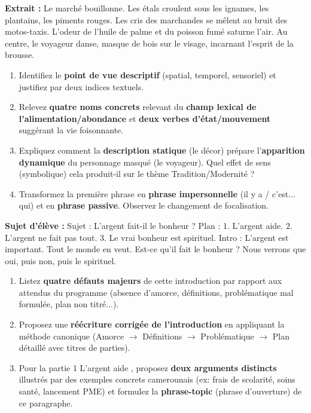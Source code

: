 \documentclass[11pt]{article}
\begin{document}
\begin{exercice}
\textbf{Extrait :} \og Le marché bouillonne. Les étals croulent sous les ignames, les plantains, les piments rouges. Les cris des marchandes se mêlent au bruit des motos-taxis. L'odeur de l'huile de palme et du poisson fumé saturne l'air. Au centre, le voyageur danse, masque de bois sur le visage, incarnant l'esprit de la brousse. \fg{}
\begin{enumerate}
    \item Identifiez le \textbf{point de vue descriptif} (spatial, temporel, sensoriel) et justifiez par deux indices textuels.
    \item Relevez \textbf{quatre noms concrets} relevant du \textbf{champ lexical de l'alimentation/abondance} et \textbf{deux verbes d'état/mouvement} suggérant la vie foisonnante.
    \item Expliquez comment la \textbf{description statique} (le décor) prépare l'\textbf{apparition dynamique} du personnage masqué (le voyageur). Quel effet de sens (symbolique) cela produit-il sur le thème Tradition/Modernité ?
    \item Transformez la première phrase en \textbf{phrase impersonnelle} (il y a / c'est... qui) et en \textbf{phrase passive}. Observez le changement de focalisation.
\end{enumerate}
\end{exercice}

\begin{exercice}
\textbf{Sujet d'élève :} \og Sujet : L'argent fait-il le bonheur ? Plan : 1. L'argent aide. 2. L'argent ne fait pas tout. 3. Le vrai bonheur est spirituel. Intro : L'argent est important. Tout le monde en veut. Est-ce qu'il fait le bonheur ? Nous verrons que oui, puis non, puis le spirituel. \fg{}
\begin{enumerate}
    \item Listez \textbf{quatre défauts majeurs} de cette introduction par rapport aux attendus du programme (absence d'amorce, définitions, problématique mal formulée, plan non titré...).
    \item Proposez une \textbf{réécriture corrigée de l'introduction} en appliquant la méthode canonique (Amorce $\rightarrow$ Définitions $\rightarrow$ Problématique $\rightarrow$ Plan détaillé avec titres de parties).
    \item Pour la partie 1 \og L'argent aide \fg{}, proposez \textbf{deux arguments distincts} illustrés par des exemples concrets camerounais (ex: frais de scolarité, soins santé, lancement PME) et formulez la \textbf{phrase-topic} (phrase d'ouverture) de ce paragraphe.
\end{enumerate}
\end{exercice}
\end{document}
